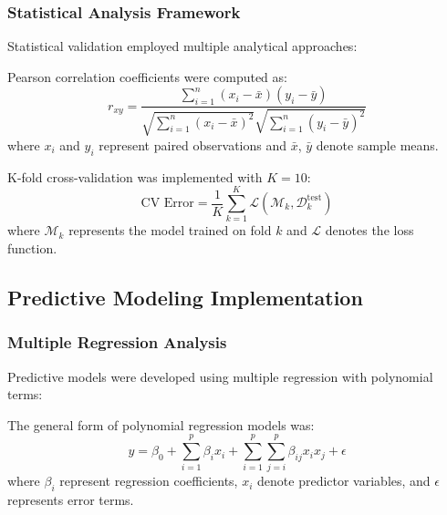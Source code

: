 \subsubsection{Statistical Analysis Framework}

Statistical validation employed multiple analytical approaches:

\begin{definition}
Pearson correlation coefficients were computed as:
\begin{equation}
r_{xy} = \frac{\sum_{i=1}^{n}(x_i - \bar{x})(y_i - \bar{y})}{\sqrt{\sum_{i=1}^{n}(x_i - \bar{x})^2}\sqrt{\sum_{i=1}^{n}(y_i - \bar{y})^2}}
\end{equation}
where $x_i$ and $y_i$ represent paired observations and $\bar{x}$, $\bar{y}$ denote sample means.
\end{definition}

\begin{definition}
K-fold cross-validation was implemented with $K = 10$:
\begin{equation}
\text{CV Error} = \frac{1}{K} \sum_{k=1}^{K} \mathcal{L}(\mathcal{M}_k, \mathcal{D}_k^{\text{test}})
\end{equation}
where $\mathcal{M}_k$ represents the model trained on fold $k$ and $\mathcal{L}$ denotes the loss function.
\end{definition}

\subsection{Predictive Modeling Implementation}

\subsubsection{Multiple Regression Analysis}

Predictive models were developed using multiple regression with polynomial terms:

\begin{definition}
The general form of polynomial regression models was:
\begin{equation}
y = \beta_0 + \sum_{i=1}^{p} \beta_i x_i + \sum_{i=1}^{p} \sum_{j=i}^{p} \beta_{ij} x_i x_j + \epsilon
\end{equation}
where $\beta_i$ represent regression coefficients, $x_i$ denote predictor variables, and $\epsilon$ represents error terms.
\end{definition}

